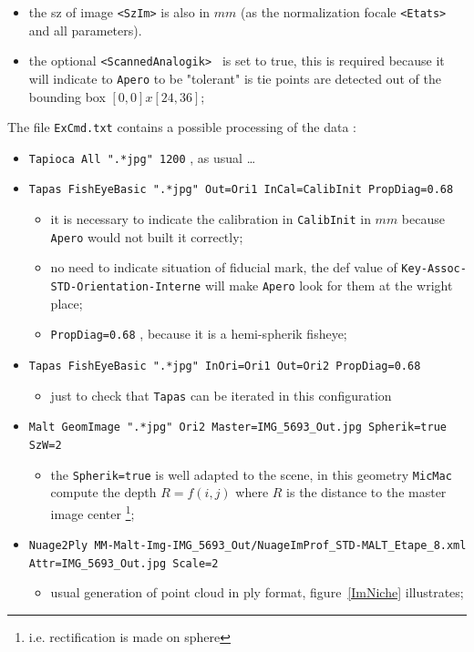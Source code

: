\begin{itemize}
    \item  the sz of image {\tt <SzIm>} is also in $mm$ (as the normalization focale
            {\tt <Etats>}  and all parameters).
     \item  the optional {\tt  <ScannedAnalogik> } is set to true, this is required because
            it will indicate to {\tt Apero} to be "tolerant" is tie points are detected out
            of the bounding box $[0,0]x[24,36]$;
\end{itemize}

The file {\tt ExCmd.txt} contains a possible processing of the data :


\begin{itemize}
    \item {\tt Tapioca  All ".*jpg"  1200}  , as usual \dots
    \item {\tt Tapas  FishEyeBasic  ".*jpg"  Out=Ori1 InCal=CalibInit PropDiag=0.68}

     \begin{itemize}
          \item  it is necessary to indicate the calibration in {\tt CalibInit} in $mm$ because {\tt Apero}
                 would not built it correctly;
          \item no need to indicate situation of fiducial mark, the def value of {\tt Key-Assoc-STD-Orientation-Interne}
                will make {\tt Apero} look for them at the wright place;
           \item {\tt PropDiag=0.68} , because it is a hemi-spherik fisheye;
      \end{itemize}

    \item {\tt Tapas FishEyeBasic ".*jpg" InOri=Ori1  Out=Ori2 PropDiag=0.68}
    \begin{itemize}
           \item  just to check that {\tt Tapas} can be iterated in  this  configuration
    \end{itemize}
    \item {\tt Malt GeomImage ".*jpg" Ori2 Master=IMG\_5693\_Out.jpg Spherik=true SzW=2}
    \begin{itemize}
             \item the {\tt Spherik=true} is well adapted  to the scene, in this geometry
                   {\tt MicMac} compute the depth  $R=f(i,j)$ where $R$ is the distance
                   to the master image center \footnote{i.e. rectification is made on sphere};
    \end{itemize}

    \item {\tt Nuage2Ply MM-Malt-Img-IMG\_5693\_Out/NuageImProf\_STD-MALT\_Etape\_8.xml Attr=IMG\_5693\_Out.jpg Scale=2}

    \begin{itemize}
             \item usual generation of point cloud in ply format, figure~\ref{ImNiche} illustrates;
    \end{itemize}

\end{itemize}




